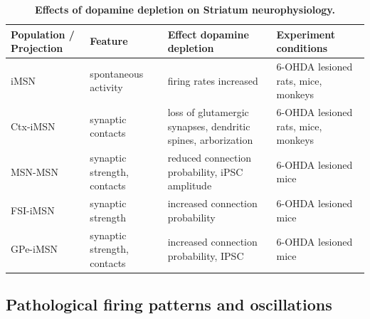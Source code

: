 %
\begin{table} %
\centering
\caption{{\bf Effects of dopamine depletion on Striatum neurophysiology.}}
\begin{adjustbox}{height=0.3\textheight}
\begin{tabular}{p{0.06\textheight}p{0.15\textheight}p{0.35\textheight}p{0.35\textheight}}%
\toprule
%
Population / Projection & Feature & Effect dopamine depletion & Experiment conditions \\ \midrule
%
iMSN & spontaneous activity & firing rates increased & 6-OHDA lesioned rats, mice, monkeys \cite{mallet_cortical_2006,kita_cortical_2011,day_selective_2006,fieblinger_cell_2014} \\
%
Ctx-iMSN & synaptic contacts & loss of glutamergic synapses, dendritic spines, arborization & 6-OHDA lesioned rats, mice, monkeys \cite{day_selective_2006,fieblinger_cell_2014,suarez_l-dopa_2014} \\
%
MSN-MSN & synaptic strength, contacts & reduced connection probability, iPSC amplitude &  6-OHDA lesioned mice \cite{taverna_recurrent_2008} \\
%
FSI-iMSN & synaptic strength & increased connection probability & 6-OHDA lesioned mice \cite{gittis_rapid_2011} \\
%
GPe-iMSN & synaptic strength, contacts & increased connection probability, IPSC & 6-OHDA lesioned mice \cite{corbit_pallidostriatal_2016} \\
\bottomrule
\end{tabular}
\end{adjustbox}
\label{tab:dd-striatum-phys}
\end{table}


%
%
%

%
%
%
\subsection{Pathological firing patterns and oscillations}
%
%
%
%

%
%
%
%
%
%
%
%

%
%
%
%
%
%
%
%
%
%

